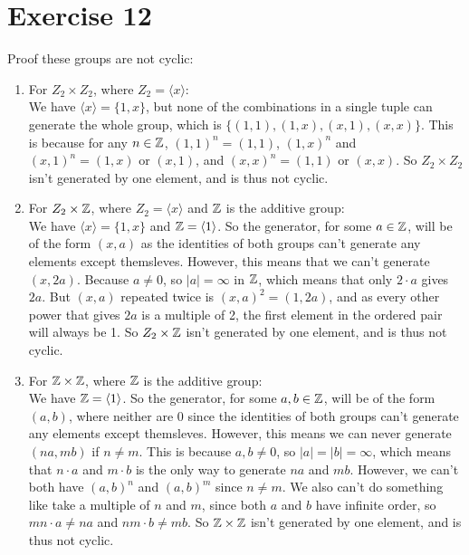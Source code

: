 \documentclass[12pt]{article}
\begin{document}
    \section*{Exercise 12}
    Proof these groups are not cyclic: 
    \begin{enumerate}[label=\textbf{\alph*.}]
        \item 
            For $Z_2 \times Z_2$,
            where $Z_2 = \langle x \rangle$: \\
            We have $\langle x \rangle = \{1, x\}$,
            but none of the combinations in a single tuple
            can generate the whole group,
            which is $\{(1, 1), (1, x), (x, 1), (x, x)\}$.
            This is because for any $n \in \mathbb{Z}$,
            $(1, 1)^n = (1, 1)$,
            $(1, x)^n$ and $(x, 1)^n = (1, x)$ or $(x, 1)$,
            and $(x, x)^n = (1, 1)$ or $(x, x)$.
            So $Z_2 \times Z_2$ isn't generated by one element,
            and is thus not cyclic.
        \item
            For $Z_2 \times \mathbb{Z}$,
            where $Z_2 = \langle x \rangle$
            and $\mathbb{Z}$ is the additive group: \\
            We have $\langle x \rangle = \{1, x\}$
            and $\mathbb{Z} = \langle 1 \rangle$.
            So the generator, for some $a \in \mathbb{Z}$,
            will be of the form $(x, a)$
            as the identities of both groups can't generate
            any elements except themsleves.
            However, this means that we can't generate $(x, 2a)$.
            Because $a \neq 0$, so $|a| = \infty$ in $\mathbb{Z}$,
            which means that only $2 \cdot a$ gives $2a$.
            But $(x, a)$ repeated twice is $(x, a)^2 = (1, 2a)$,
            and as every other power that gives $2a$ is a multiple of 2,
            the first element in the ordered pair will always be 1. 
            So $Z_2 \times \mathbb{Z}$ isn't generated by one element,
            and is thus not cyclic.
        \item
            For $\mathbb{Z} \times \mathbb{Z}$,
            where $\mathbb{Z}$ is the additive group: \\
            We have $\mathbb{Z} = \langle 1 \rangle$.
            So the generator, for some $a, b \in \mathbb{Z}$,
            will be of the form $(a, b)$,
            where neither are 0 
            since the identities of both groups can't generate any elements
            except themsleves.
            However, this means we can never generate $(na, mb)$
            if $n \neq m$.
            This is because $a, b \neq 0$,
            so $|a| = |b| = \infty$,
            which means that $n \cdot a$ and $m \cdot b$ is the only
            way to generate $na$ and $mb$.
            However, we can't both have $(a, b)^n$ and $(a, b)^m$
            since $n \neq m$.
            We also can't do something like take a multiple of $n$ and $m$,
            since both $a$ and $b$ have infinite order,
            so $mn \cdot a \neq na$ and $nm \cdot b \neq mb$.
            So $\mathbb{Z} \times \mathbb{Z}$ isn't generated by one element,
            and is thus not cyclic.
    \end{enumerate}
\end{document}
